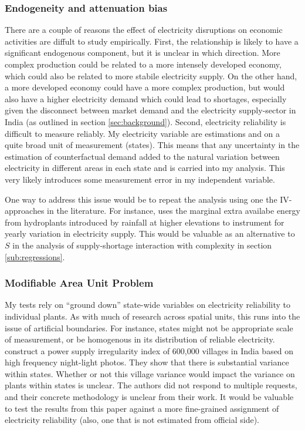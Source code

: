 \documentclass[11pt]{article}
\begin{document}
\subsubsection{Endogeneity and attenuation bias}
\label{sec:orgd4457e7}
There are a couple of reasons the effect of electricity disruptions on economic activities are diffult to study empirically. First, the relationship is likely to have a significant endogenous component, but it is unclear in which direction. More complex production could be related to a more intensely developed economy, which could also be related to more stabile electricity supply. On the other hand, a more developed economy could have a more complex production, but would also have a higher electricity demand which could lead to shortages, especially given the disconnect between market demand and the electricity supply-sector in India (as outlined in section \ref{sec:background}). Second, electricity reliability is difficult to measure reliably. My electricity variable are estimations and on a quite broad unit of measurement (states). This means that any uncertainty in the estimation of counterfactual demand added to the natural variation between electricity in different areas in each state and is carried into my analysis. This very likely introduces some measurement error in my independent variable.

One way to address this issue would be to repeat the analysis using one the IV-approaches in the literature. For instance, \cite{allcott_how_2016} uses the marginal extra availabe energy from hydroplants introduced by rainfall at higher elevations to instrument for yearly variation in electricity supply. This would be valuable as an alternative to $S$ in the analysis of supply-shortage interaction with complexity in section \ref{sub:regressions}.

\subsubsection{Modifiable Area Unit Problem}
\label{sec:org4e3cc26}
My tests rely on ``ground down'' state-wide variables on electricity reliability to individual plants. As with much of research across spatial units, this runs into the issue of artificial boundaries. For instance, states might not be appropriate scale of measurement, or be homogenous in its distribution of reliable electricity. \cite{min_whose_2017-2} construct a power supply irregularity index of 600,000 villages in India based on high frequency night-light photos. They show that there is substantial variance within states. Whether or not this village variance would impact the variance on plants within states is unclear. The authors did not respond to multiple requests, and their concrete methodology is unclear from their work. It would be valuable to test the results from this paper against a more fine-grained assignment of electricity reliability (also, one that is not estimated from official side).
\end{document}
